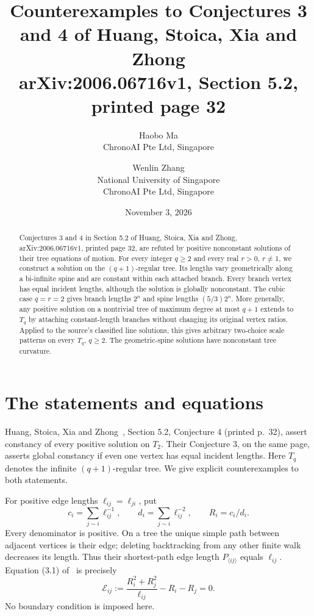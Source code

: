 \documentclass[11pt]{article}
\title{Counterexamples to Conjectures 3 and 4 of Huang, Stoica, Xia and Zhong\\
\large arXiv:2006.06716v1, Section 5.2, printed page 32}
\author{Haobo Ma\\\small ChronoAI Pte Ltd, Singapore
\and Wenlin Zhang\\\small National University of Singapore\\\small ChronoAI Pte Ltd, Singapore}
\date{November 3, 2026}
\newcommand{\E}{\mathcal E}
\begin{document}
\maketitle
\begin{abstract}
Conjectures 3 and 4 in Section 5.2 of Huang, Stoica, Xia and Zhong,
arXiv:2006.06716v1, printed page 32, are refuted by positive nonconstant solutions of their
tree equations of motion. For every integer $q\geq2$ and every real
$r>0$, $r\ne1$, we construct a solution on the $(q+1)$-regular tree.
Its lengths vary geometrically along a bi-infinite spine and are constant
within each attached branch. Every branch vertex has equal incident
lengths, although the solution is globally nonconstant. The cubic case
$q=r=2$ gives branch lengths $2^n$ and spine lengths $(5/3)2^n$.
More generally, any positive solution on a nontrivial tree of maximum degree at most
$q+1$ extends to $T_q$ by attaching constant-length branches without
changing its original vertex ratios. Applied to the source's classified
line solutions, this gives arbitrary two-choice scale patterns on every
$T_q$, $q\geq2$. The geometric-spine solutions have nonconstant tree
curvature.
\end{abstract}

\section{The statements and equations}
Huang, Stoica, Xia and Zhong~\cite{HSXZ}, Section 5.2, Conjecture 4
(printed p.~32), assert constancy of every positive solution on $T_2$.
Their Conjecture 3, on the same page, asserts global constancy if even one
vertex has equal incident lengths. Here $T_q$ denotes the infinite
$(q+1)$-regular tree. We give explicit counterexamples to both statements.

For positive edge lengths $\ell_{ij}=\ell_{ji}$, put
\begin{equation}\label{eq:definitions}
 c_i=\sum_{j\sim i}\ell_{ij}^{-1},\qquad
 d_i=\sum_{j\sim i}\ell_{ij}^{-2},\qquad R_i=c_i/d_i.
\end{equation}
Every denominator is positive. On a tree the unique simple path between
adjacent vertices is their edge; deleting backtracking from any other
finite walk decreases its length. Thus their shortest-path edge length
$P_{\langle ij\rangle}$ equals $\ell_{ij}$. Equation (3.1) of~\cite{HSXZ}
is precisely
\begin{equation}\label{eq:motion}
 \E_{ij}:=\frac{R_i^2+R_j^2}{\ell_{ij}}-R_i-R_j=0.
\end{equation}
No boundary condition is imposed here.
\end{document}
